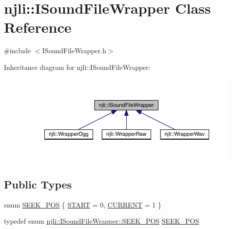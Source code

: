 \hypertarget{classnjli_1_1_i_sound_file_wrapper}{}\section{njli\+:\+:I\+Sound\+File\+Wrapper Class Reference}
\label{classnjli_1_1_i_sound_file_wrapper}


{\ttfamily \#include $<$I\+Sound\+File\+Wrapper.\+h$>$}



Inheritance diagram for njli\+:\+:I\+Sound\+File\+Wrapper\+:\nopagebreak
\begin{figure}[H]
\begin{center}
\leavevmode
\includegraphics[width=350pt]{classnjli_1_1_i_sound_file_wrapper__inherit__graph}
\end{center}
\end{figure}
\subsection*{Public Types}
\begin{DoxyCompactItemize}
\item 
enum \mbox{\hyperlink{classnjli_1_1_i_sound_file_wrapper_ab4b07720cb2823b4f3f9fa98ee07a6e7}{S\+E\+E\+K\+\_\+\+P\+OS}} \{ \mbox{\hyperlink{classnjli_1_1_i_sound_file_wrapper_ab4b07720cb2823b4f3f9fa98ee07a6e7a1f8c3cbe37d39eb58733a1d67615827e}{S\+T\+A\+RT}} = 0, 
\mbox{\hyperlink{classnjli_1_1_i_sound_file_wrapper_ab4b07720cb2823b4f3f9fa98ee07a6e7a32ec778d5282ca8c51937d66b6db9991}{C\+U\+R\+R\+E\+NT}} = 1
 \}
\item 
typedef enum \mbox{\hyperlink{classnjli_1_1_i_sound_file_wrapper_ab4b07720cb2823b4f3f9fa98ee07a6e7}{njli\+::\+I\+Sound\+File\+Wrapper\+::\+S\+E\+E\+K\+\_\+\+P\+OS}} \mbox{\hyperlink{classnjli_1_1_i_sound_file_wrapper_a5374e14efd1564c10852da7cfe31164a}{S\+E\+E\+K\+\_\+\+P\+OS}}
\end{DoxyCompactItemize}
